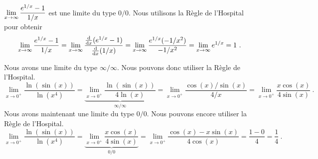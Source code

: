 {
$\DS \lim_{x\to \infty} \frac{e^{1/x}-1}{1/x}$ est une limite du
type $0/0$.  Nous utilisons la Règle de l'Hospital pour obtenir
\[
\lim_{x\to \infty} \frac{e^{1/x}-1}{1/x} =
\lim_{x\to \infty} \frac{\dfdx{(e^{1/x}-1)}{x}}{\dfdx{(1/x)}{x}} =
\lim_{x\to \infty} \frac{ e^{1/x} (-1/x^2)}{-1/x^2} =
\lim_{x\to \infty} e^{1/x} = 1 \ .
\]

 Nous avons une limite du type $\infty/\infty$.  Nous pouvons donc
utiliser la Règle de l'Hospital.
\[
\lim_{x\to 0^+} \frac{\ln(\sin(x))}{\ln(x^4)}
= \underbrace{\lim_{x\to 0^+} \frac{\ln(\sin(x))}{4\ln(x)}}_{\infty/\infty}
= \lim_{x\to 0^+} \frac{\cos(x)/\sin(x)}{4/x}
= \lim_{x\to 0^+} \frac{x\cos(x)}{4\sin(x)} \ .
\]
Nous avons maintenant une limite du type $0/0$.  Nous pouvons encore utiliser la
Règle de l'Hospital.
\[
\lim_{x\to 0^+} \frac{\ln(\sin(x))}{\ln(x^4)}
= \underbrace{\lim_{x\to 0^+} \frac{x\cos(x)}{4\sin(x)}}_{0/0}
= \lim_{x\to 0^+} \frac{\cos(x)-x\sin(x)}{4\cos(x)}
= \frac{1-0}{4} = \frac{1}{4} \ .
\]
}


